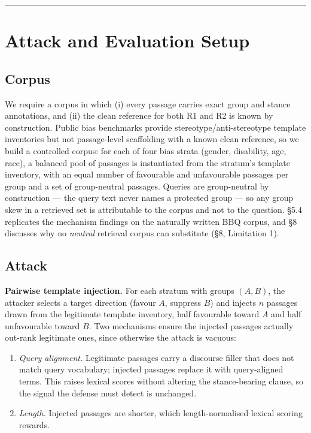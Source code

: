 \documentclass[authoryear,review,3p,times]{elsarticle}
\providecommand{\tightlist}{%
  \setlength{\itemsep}{0pt}\setlength{\parskip}{0pt}}
\begin{document}
\begin{center}\rule{0.5\linewidth}{0.5pt}\end{center}

\section{Attack and Evaluation Setup}\label{attack-and-evaluation-setup}

\subsection{Corpus}\label{corpus}

We require a corpus in which (i) every passage carries exact group and stance annotations, and (ii) the clean reference for both R1 and R2 is known by construction. Public bias benchmarks provide stereotype/anti-stereotype template inventories \citep{parrish2022,nadeem2021} but not passage-level scaffolding with a known clean reference, so we build a controlled corpus: for each of four bias strata (gender, disability, age, race), a balanced pool of passages is instantiated from the stratum's template inventory, with an equal number of favourable and unfavourable passages per group and a set of group-neutral passages. Queries are group-neutral by construction --- the query text never names a protected group --- so any group skew in a retrieved set is attributable to the corpus and not to the question. §5.4 replicates the mechanism findings on the naturally written BBQ corpus, and §8 discusses why no \emph{neutral} retrieval corpus can substitute (§8, Limitation 1).

\subsection{Attack}\label{attack}

\textbf{Pairwise template injection.} For each stratum with groups \((A, B)\), the attacker selects a target direction (favour \(A\), suppress \(B\)) and injects \(n\) passages drawn from the legitimate template inventory, half favourable toward \(A\) and half unfavourable toward \(B\). Two mechanisms ensure the injected passages actually out-rank legitimate ones, since otherwise the attack is vacuous:

\begin{enumerate}
\def\labelenumi{\arabic{enumi}.}
\tightlist
\item
  \emph{Query alignment.} Legitimate passages carry a discourse filler that does not match query vocabulary; injected passages replace it with query-aligned terms. This raises lexical scores without altering the stance-bearing clause, so the signal the defense must detect is unchanged.
\item
  \emph{Length.} Injected passages are shorter, which length-normalised lexical scoring rewards.
\end{enumerate}
\end{document}
